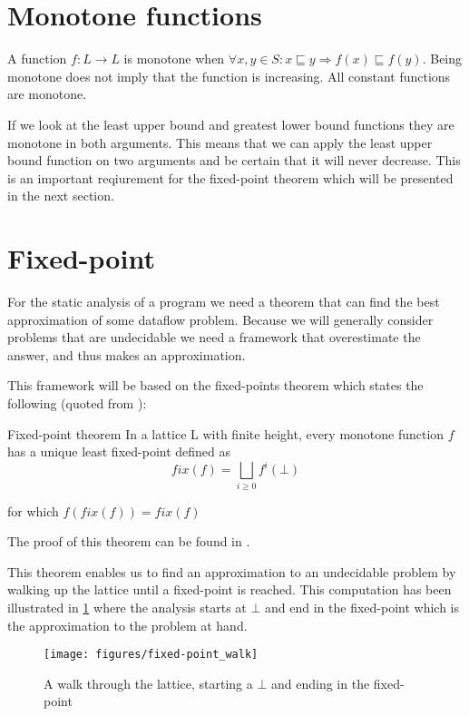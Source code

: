 \section{Monotone functions}
A function $f: L \to L$ is monotone when $\forall x,y \in S : x \sqsubseteq y \Rightarrow f(x) \sqsubseteq f(y)$.
Being monotone does not imply that the function is increasing.
All constant functions are monotone.

If we look at the least upper bound and greatest lower bound functions they are monotone in both arguments.
This means that we can apply the least upper bound function on two arguments and be certain that it will never decrease.
This is an important reqiurement for the fixed-point theorem which will be presented in the next section.

\section{Fixed-point}
For the static analysis of a program we need a theorem that can find the best approximation of some dataflow problem.
Because we will generally consider problems that are undecidable  we need a framework that overestimate the answer, and thus makes an approximation.

This framework will be based on the fixed-points theorem which states the following (quoted from \citet[p.~13]{schwartzbach}):

\begin{definition}{Fixed-point theorem}
In a lattice L with finite height, every monotone function $f$ has a unique least fixed-point defined as
\[ fix(f) = \bigsqcup_{i \ge 0} f^i(\bot) \]

for which $f(fix(f)) = fix(f)$
\end{definition}

\noindent
The proof of this theorem can be found in \citep[p.~13]{schwartzbach}.

This theorem enables us to find an approximation to an undecidable problem by walking up the lattice until a fixed-point is reached.
This computation has been illustrated in \cref{lattice_walk} where the analysis starts at $\bot$ and end in the fixed-point which is the approximation to the problem at hand.

\begin{figure}
\begin{center}
\texttt{[image: figures/fixed-point\_walk]}
\end{center}
\caption{A walk through the lattice, starting a $\bot$ and ending in the fixed-point}
\label{lattice_walk}
\end{figure}

